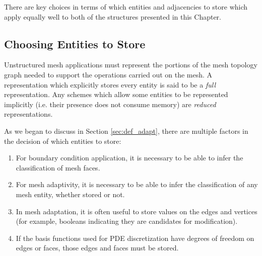 There are key choices in terms of which entities
and adjacencies to store which apply equally well
to both of the structures presented in this Chapter.

\subsection{Choosing Entities to Store}

Unstructured mesh applications must represent
the portions of the mesh topology graph
needed to support the operations carried out on the mesh.
A representation which explicitly stores
every entity is said to be a {\it full}
representation.
Any schemes which allow some entities to be represented
implicitly (i.e. their presence does not consume memory)
are {\it reduced} representations.

As we began to discuss in Section \ref{sec:def_adapt},
there are multiple factors in the decision of which entities to store:
\begin{enumerate}
\item For boundary condition application, it is necessary to
be able to infer the classification of mesh faces.
\item For mesh adaptivity, it is necessary to be able to
infer the classification of any mesh entity, whether stored or not.
\item In mesh adaptation, it is often useful to store values
on the edges and vertices (for example, booleans indicating they
are candidates for modification).
\item If the basis functions used for PDE discretization have
degrees of freedom on edges or faces, those edges and faces
must be stored.
\end{enumerate}

